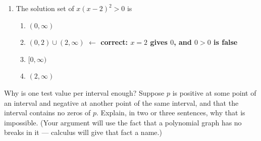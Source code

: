 \documentclass[10pt]{article}
\begin{document}
\begin{enumerate}[itemsep=10pt]
\smallskip
\renewcommand{\arraystretch}{1.4}
\begin{center}
\begin{tabular}{|c|c|c|c|c|c|c|}
\hline
$x$ & $0$ & $1$ & $2$ & $3$ & $4$ & $5$ \\
\hline
$y$ & $2$ & $2$ & $8$ & $26$ & $62$ & $122$ \\
\hline
\end{tabular}
\end{center}
\smallskip

\begin{enumerate}[label=(\alph*), itemsep=6pt]
  \item First differences: 
  \item Second differences: 
  \item Third differences: 
  \item Which regression --- linear, quadratic, cubic, or quartic --- fits this
        data exactly, and how do the differences tell you?
        \quad {}
  \item The calculator returns the coefficients. Name one thing it does
        \textit{not} decide for you. \quad {}
\end{enumerate}

\item The solution set of $x(x-2)^2 > 0$ is

\begin{enumerate}[label=\Alph*., itemsep=3pt]
  \item $(0, \infty)$
  \item $(0,2) \cup (2,\infty)$ \quad \textcolor{keyred}{\textbf{$\leftarrow$ correct: $x=2$ gives $0$, and $0 > 0$ is false}}
  \item $[0, \infty)$
  \item $(2, \infty)$
\end{enumerate}

\end{enumerate}

\vspace{0.1in}

\boxguard
\begin{extensionbox}
Why is one test value per interval enough? Suppose $p$ is positive at some
point of an interval and negative at another point of the same interval, and
that the interval contains no zeros of $p$. Explain, in two or three sentences,
why that is impossible. (Your argument will use the fact that a polynomial
graph has no breaks in it --- calculus will give that fact a name.)

\vspace{0.05in}
\end{extensionbox}
\end{document}
